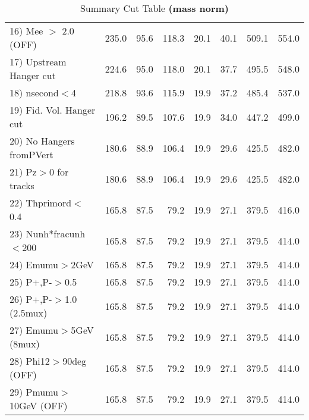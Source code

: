 \begin{table}[h!]
{{\begin{tabular}{||l||r|r|r|r|r||r||r||}
 16) Mee $>$ 2.0  (OFF)   &     235.0 &      95.6 &     118.3 &      20.1 &      40.1 &     509.1 &     554.0 \\
 17) Upstream Hanger cut  &     224.6 &      95.0 &     118.0 &      20.1 &      37.7 &     495.5 &     548.0 \\
 18) nsecond$<$4          &     218.8 &      93.6 &     115.9 &      19.9 &      37.2 &     485.4 &     537.0 \\
 19) Fid. Vol. Hanger cut &     196.2 &      89.5 &     107.6 &      19.9 &      34.0 &     447.2 &     499.0 \\
 20) No Hangers fromPVert &     180.6 &      88.9 &     106.4 &      19.9 &      29.6 &     425.5 &     482.0 \\
 21) Pz$>$0 for tracks    &     180.6 &      88.9 &     106.4 &      19.9 &      29.6 &     425.5 &     482.0 \\
 22) Thprimord$<$0.4      &     165.8 &      87.5 &      79.2 &      19.9 &      27.1 &     379.5 &     416.0 \\
 23) Nunh*fracunh$<$200   &     165.8 &      87.5 &      79.2 &      19.9 &      27.1 &     379.5 &     414.0 \\
 24) Emumu$>$2GeV         &     165.8 &      87.5 &      79.2 &      19.9 &      27.1 &     379.5 &     414.0 \\
 25) P+,P-$>$0.5          &     165.8 &      87.5 &      79.2 &      19.9 &      27.1 &     379.5 &     414.0 \\
 26) P+,P-$>$1.0 (2.5mux) &     165.8 &      87.5 &      79.2 &      19.9 &      27.1 &     379.5 &     414.0 \\
 27) Emumu$>$5GeV  (8mux) &     165.8 &      87.5 &      79.2 &      19.9 &      27.1 &     379.5 &     414.0 \\
 28) Phi12$>$90deg  (OFF) &     165.8 &      87.5 &      79.2 &      19.9 &      27.1 &     379.5 &     414.0 \\
 29) Pmumu$>$10GeV  (OFF) &     165.8 &      87.5 &      79.2 &      19.9 &      27.1 &     379.5 &     414.0 \\
 \hline
 \hline
 \end{tabular}
 \caption{Summary Cut Table \textbf{ (mass norm) }}
 \label{tab-sumcut}
 }}
 \end{table}
 \endinput
